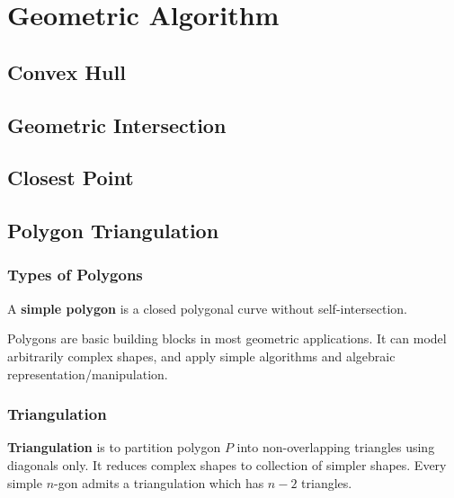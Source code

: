 	\chapter{Geometric Algorithm}
		\section{Convex Hull}

		\section{Geometric Intersection}

		\section{Closest Point}

		\section{Polygon Triangulation}
			\subsection{Types of Polygons}
				\begin{definition}
					A \textbf{simple polygon} is a closed polygonal curve without self-intersection.
				\end{definition}

				\begin{figure}[h!]
					\centering
				\end{figure}

				Polygons are basic building blocks in most geometric applications. It can model arbitrarily complex shapes, and apply simple algorithms and algebraic representation/manipulation.

			\subsection{Triangulation}
				\begin{definition}[Triangulation]
					\textbf{Triangulation} is to partition polygon $P$ into non-overlapping triangles using diagonals only. It reduces complex shapes to collection of simpler shapes. Every simple $n$-gon admits a triangulation which has $n-2$ triangles.				
				\end{definition}

